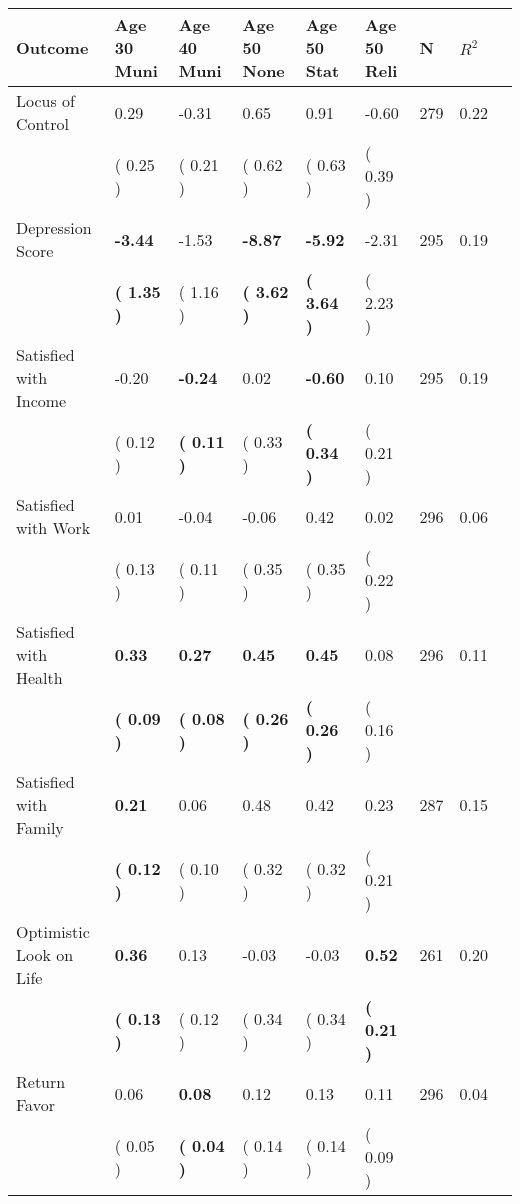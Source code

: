 \begin{tabular}{L{6.2cm} C{1.8cm} C{1.8cm} C{1.8cm} C{1.8cm} C{1.8cm} C{1.8cm} C{0.3cm} C{0.3cm}}
\toprule
 \textbf{Outcome} & \textbf{Age 30 Muni} & \textbf{Age 40 Muni} & \textbf{Age 50 None} & \textbf{Age 50 Stat} & \textbf{Age 50 Reli} & \textbf{N} & \textbf{$ R^2$} \\
\midrule
Locus of Control &      0.29 &     -0.31 &      0.65 &      0.91 &     -0.60  & 279 &       0.22 \\ 
 & (     0.25 ) & (     0.21 ) & (     0.62 ) & (     0.63 ) & (     0.39 )  & \\
Depression Score & \textbf{    -3.44} &     -1.53 & \textbf{    -8.87} & \textbf{    -5.92} &     -2.31  & 295 &       0.19 \\ 
 & \textbf{(     1.35 )} & (     1.16 ) & \textbf{(     3.62 )} & \textbf{(     3.64 )} & (     2.23 )  & \\
Satisfied with Income &     -0.20 & \textbf{    -0.24} &      0.02 & \textbf{    -0.60} &      0.10  & 295 &       0.19 \\ 
 & (     0.12 ) & \textbf{(     0.11 )} & (     0.33 ) & \textbf{(     0.34 )} & (     0.21 )  & \\
Satisfied with Work &      0.01 &     -0.04 &     -0.06 &      0.42 &      0.02  & 296 &       0.06 \\ 
 & (     0.13 ) & (     0.11 ) & (     0.35 ) & (     0.35 ) & (     0.22 )  & \\
Satisfied with Health & \textbf{     0.33} & \textbf{     0.27} & \textbf{     0.45} & \textbf{     0.45} &      0.08  & 296 &       0.11 \\ 
 & \textbf{(     0.09 )} & \textbf{(     0.08 )} & \textbf{(     0.26 )} & \textbf{(     0.26 )} & (     0.16 )  & \\
Satisfied with Family & \textbf{     0.21} &      0.06 &      0.48 &      0.42 &      0.23  & 287 &       0.15 \\ 
 & \textbf{(     0.12 )} & (     0.10 ) & (     0.32 ) & (     0.32 ) & (     0.21 )  & \\
Optimistic Look on Life & \textbf{     0.36} &      0.13 &     -0.03 &     -0.03 & \textbf{     0.52}  & 261 &       0.20 \\ 
 & \textbf{(     0.13 )} & (     0.12 ) & (     0.34 ) & (     0.34 ) & \textbf{(     0.21 )}  & \\
Return Favor &      0.06 & \textbf{     0.08} &      0.12 &      0.13 &      0.11  & 296 &       0.04 \\ 
 & (     0.05 ) & \textbf{(     0.04 )} & (     0.14 ) & (     0.14 ) & (     0.09 )  & \\

\end{tabular}

